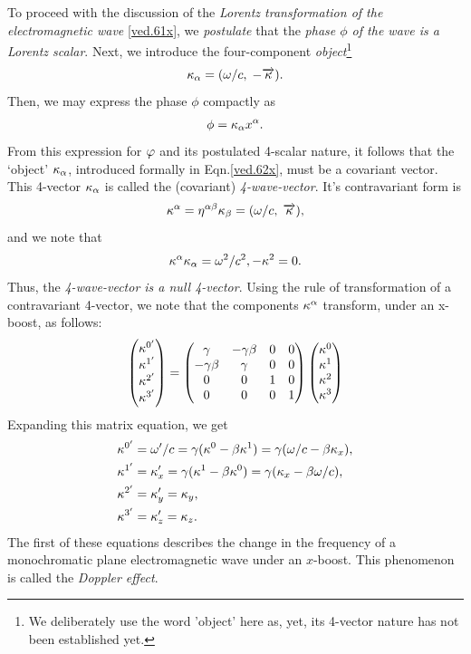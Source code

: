 To proceed with  the discussion of the \textsl{Lorentz 
transformation of the electromagnetic wave} 
\eqref{ved.61x}, 
we \textsl{postulate} that the \textsl{phase $\phi$ of the 
wave is a {Lorentz scalar}}. Next, we  introduce the 
four-component \textsl{object}\footnote{We deliberately use 
the word 'object' here as, yet, its 4-vector nature has not 
been established yet.}
\begin{align}\label{ved.64x}
{\kappa}_{{\alpha}} =({\omega}/c, \;-\overrightarrow{{\kappa}}).
\end{align}
Then, we may express the phase $\phi$ compactly as
\begin{align}\label{ved.65x}
\phi={\kappa}_{{\alpha}} x^{{\alpha}}.
\end{align}
From this expression for ${\varphi}$ and its postulated 
4-scalar  
nature, it follows that the `object' ${\kappa}_{{\alpha}}$, 
introduced 
formally in Eqn.\eqref{ved.62x}, must be a covariant 
vector. 
This 4-vector ${\kappa}_{{\alpha}}$ is called the (covariant) 
\textsl{4-wave-vector}. It's contravariant form is
\begin{equation}\label{ved.66x}
{\kappa}^{{\alpha}} =\eta^{{\alpha}{\beta}}{\kappa}_{{\beta}}= ({\omega}/c,
\;\overrightarrow{{\kappa}}),
\end{equation}
and we note that
\begin{equation}\label{ved.67x}
{\kappa}^{{\alpha}} {\kappa}_{{\alpha}} = {\omega}^2/c^2, -{\kappa}^2=0.
\end{equation}
Thus,  the \textsl{4-wave-vector is a null 4-vector}. Using 
the rule of transformation of a contravariant 4-vector, we 
note that the components ${\kappa}^{{\alpha}}$ transform, under an 
x-boost, as  follows:
\begin{align}\label{ved.68x}
\begin{pmatrix}
{\ensuremath{{\kappa}}}^{0'}\\{{\kappa}}^{1'}\\{{\kappa}}^{2'} \\{{\kappa}}^{3'}
\end{pmatrix}
=\begin{pmatrix}
{\gamma} &-{\gamma}{\beta} &0&0\\
-{\gamma}{\beta} &{\gamma}&0&0\\
0&0&1&0\\0&0&0&1\\
\end{pmatrix}
\begin{pmatrix}
{\ensuremath{{\kappa}}}^0\\{{\kappa}}^1 \\{{\kappa}}^2 \\{{\kappa}}^3
\end{pmatrix}
\end{align}
Expanding this matrix equation, we get
\begin{align}\label{ved.69x}
{\ensuremath{{\kappa}}}^{0'} &={{\omega}}'/c
=\gamma({\kappa}^0 - {\beta} {\kappa}^1)
=\gamma({\omega} /c-{\beta} {\kappa}_x),\notag \\
{{\kappa}}^{1'}&= {{\kappa}}'_x
=\gamma({\kappa}^1 -{\beta} {\kappa}^0)
=\gamma({\kappa}_x-{\beta}{\omega} /c ), \notag \\
{{\kappa}}^{2'} &={{\kappa}}'_y={\kappa}_y,\notag \\
{{\kappa}}^{3'} &={{\kappa}}'_z ={\kappa}_z.
\end{align}
The first of these equations describes the change in the 
frequency of a monochromatic plane electromagnetic  wave 
under an  $x$-boost.  This phenomenon is called the 
\textsl{Doppler effect}.

